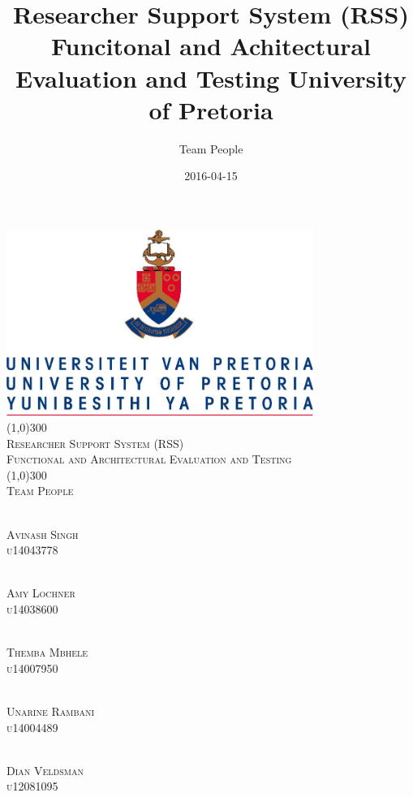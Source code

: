 \documentclass{article}
\title{
Researcher Support System (RSS)
Funcitonal and Achitectural Evaluation and Testing
University of Pretoria
}
\date{2016-04-15}
\author{\huge Team People}
\begin{document}
\begin{titlepage}
	\begin{center}
		\includegraphics[width=10cm]{UP.jpg}  \\
		[1cm]
		\line(1,0){300} \\
		[0.3cm]
		\textsc{\Large
			Researcher Support System (RSS)\\
			Functional and Architectural Evaluation and Testing
		}\\
		[0.1cm]
		\line(1,0){300} \\
		[0.7cm]
		\textsc{\Large
			Team People
		} \\



	\end{center}

	\begin{center}
	\begin{multicols}{2}
	\textsc{\large\\
		Avinash Singh\\ 
		u14043778\\ 
	}
	
	\textsc{\large\\
		Amy Lochner\\
		u14038600\\ 
	}
	
	\textsc{\large\\
		Themba Mbhele\\
		u14007950\\ 
	}

	\textsc{\large\\
		Unarine Rambani\\
		u14004489 \\
	}
	
	\textsc{\large\\
		Dian Veldsman\\
		u12081095\\
	}
	

\end{multicols}
\end{center}
\end{titlepage}
\end{document}
